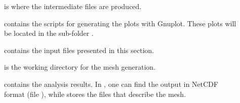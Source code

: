 \begin{description}

\item[] is where the intermediate files are produced.
\item[] contains the scripts for generating the plots with Gnuplot. These plots will be located in the sub-folder .
\item[] contains the input files presented in this section.
\item[] is the working directory for the mesh generation.
\item[] contains the analysis results. In , one can find the output in NetCDF format (file ), while  stores the files that describe the mesh.
\end{description}
